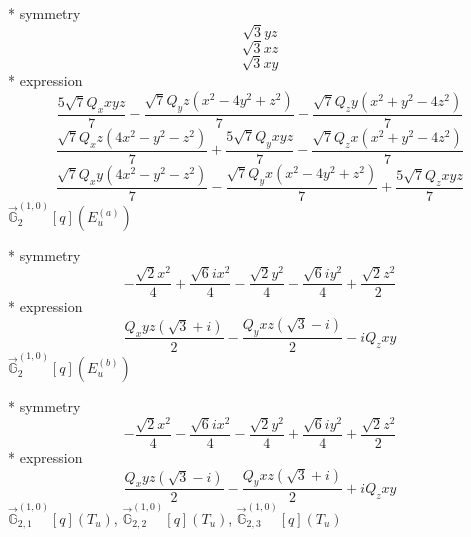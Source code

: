 \documentclass[fleqn,8pt]{jsarticle}
\begin{document}
\noindent\quad ** symmetry
\begin{dmath*}
\sqrt{3} y z
\end{dmath*}
\begin{dmath*}
\sqrt{3} x z
\end{dmath*}
\begin{dmath*}
\sqrt{3} x y
\end{dmath*}
\noindent\quad ** expression
\begin{dmath*}
\frac{5 \sqrt{7} Q_{x} x y z}{7} - \frac{\sqrt{7} Q_{y} z \left(x^{2} - 4 y^{2} + z^{2}\right)}{7} - \frac{\sqrt{7} Q_{z} y \left(x^{2} + y^{2} - 4 z^{2}\right)}{7}
\end{dmath*}
\begin{dmath*}
\frac{\sqrt{7} Q_{x} z \left(4 x^{2} - y^{2} - z^{2}\right)}{7} + \frac{5 \sqrt{7} Q_{y} x y z}{7} - \frac{\sqrt{7} Q_{z} x \left(x^{2} + y^{2} - 4 z^{2}\right)}{7}
\end{dmath*}
\begin{dmath*}
\frac{\sqrt{7} Q_{x} y \left(4 x^{2} - y^{2} - z^{2}\right)}{7} - \frac{\sqrt{7} Q_{y} x \left(x^{2} - 4 y^{2} + z^{2}\right)}{7} + \frac{5 \sqrt{7} Q_{z} x y z}{7}
\end{dmath*}
\noindent\quad $\vec{\mathbb{G}}_{2}^{(1,0)}[q](E_{u}^{(a)})$

\noindent\quad ** symmetry
\begin{dmath*}
- \frac{\sqrt{2} x^{2}}{4} + \frac{\sqrt{6} i x^{2}}{4} - \frac{\sqrt{2} y^{2}}{4} - \frac{\sqrt{6} i y^{2}}{4} + \frac{\sqrt{2} z^{2}}{2}
\end{dmath*}
\noindent\quad ** expression
\begin{dmath*}
\frac{Q_{x} y z \left(\sqrt{3} + i\right)}{2} - \frac{Q_{y} x z \left(\sqrt{3} - i\right)}{2} - i Q_{z} x y
\end{dmath*}
\noindent\quad $\vec{\mathbb{G}}_{2}^{(1,0)}[q](E_{u}^{(b)})$

\noindent\quad ** symmetry
\begin{dmath*}
- \frac{\sqrt{2} x^{2}}{4} - \frac{\sqrt{6} i x^{2}}{4} - \frac{\sqrt{2} y^{2}}{4} + \frac{\sqrt{6} i y^{2}}{4} + \frac{\sqrt{2} z^{2}}{2}
\end{dmath*}
\noindent\quad ** expression
\begin{dmath*}
\frac{Q_{x} y z \left(\sqrt{3} - i\right)}{2} - \frac{Q_{y} x z \left(\sqrt{3} + i\right)}{2} + i Q_{z} x y
\end{dmath*}
\noindent\quad $\vec{\mathbb{G}}_{2,1}^{(1,0)}[q](T_{u})$, $\vec{\mathbb{G}}_{2,2}^{(1,0)}[q](T_{u})$, $\vec{\mathbb{G}}_{2,3}^{(1,0)}[q](T_{u})$
\end{document}
